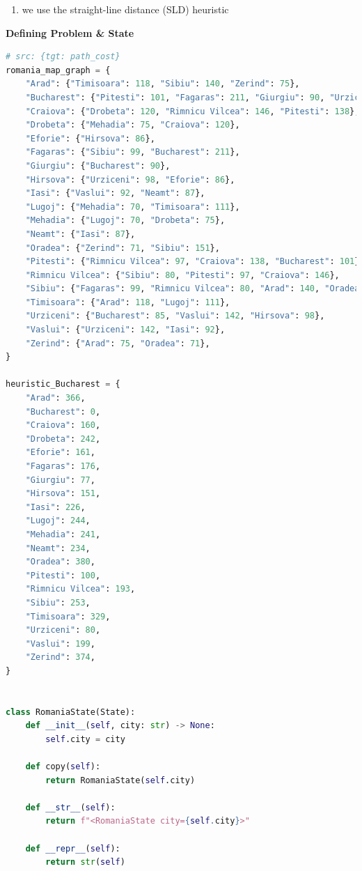 \begin{enumerate}
    \item we use the straight-line distance (SLD) heuristic
    \hfill \cite{ai/book/Artificial-Intelligence-A-Modern-Approach/Russell-Norvig}
\end{enumerate}


\vspace{0.5cm}

{\centering \textbf{Defining Problem \& State} \par}

\begin{lstlisting}[language=Python]
# src: {tgt: path_cost}
romania_map_graph = {
    "Arad": {"Timisoara": 118, "Sibiu": 140, "Zerind": 75},
    "Bucharest": {"Pitesti": 101, "Fagaras": 211, "Giurgiu": 90, "Urziceni": 85},
    "Craiova": {"Drobeta": 120, "Rimnicu Vilcea": 146, "Pitesti": 138},
    "Drobeta": {"Mehadia": 75, "Craiova": 120},
    "Eforie": {"Hirsova": 86},
    "Fagaras": {"Sibiu": 99, "Bucharest": 211},
    "Giurgiu": {"Bucharest": 90},
    "Hirsova": {"Urziceni": 98, "Eforie": 86},
    "Iasi": {"Vaslui": 92, "Neamt": 87},
    "Lugoj": {"Mehadia": 70, "Timisoara": 111},
    "Mehadia": {"Lugoj": 70, "Drobeta": 75},
    "Neamt": {"Iasi": 87},
    "Oradea": {"Zerind": 71, "Sibiu": 151},
    "Pitesti": {"Rimnicu Vilcea": 97, "Craiova": 138, "Bucharest": 101},
    "Rimnicu Vilcea": {"Sibiu": 80, "Pitesti": 97, "Craiova": 146},
    "Sibiu": {"Fagaras": 99, "Rimnicu Vilcea": 80, "Arad": 140, "Oradea": 151},
    "Timisoara": {"Arad": 118, "Lugoj": 111},
    "Urziceni": {"Bucharest": 85, "Vaslui": 142, "Hirsova": 98},
    "Vaslui": {"Urziceni": 142, "Iasi": 92},
    "Zerind": {"Arad": 75, "Oradea": 71},
}

heuristic_Bucharest = {
    "Arad": 366,
    "Bucharest": 0,
    "Craiova": 160,
    "Drobeta": 242,
    "Eforie": 161,
    "Fagaras": 176,
    "Giurgiu": 77,
    "Hirsova": 151,
    "Iasi": 226,
    "Lugoj": 244,
    "Mehadia": 241,
    "Neamt": 234,
    "Oradea": 380,
    "Pitesti": 100,
    "Rimnicu Vilcea": 193,
    "Sibiu": 253,
    "Timisoara": 329,
    "Urziceni": 80,
    "Vaslui": 199,
    "Zerind": 374,
}


class RomaniaState(State):
    def __init__(self, city: str) -> None:
        self.city = city

    def copy(self):
        return RomaniaState(self.city)
    
    def __str__(self):
        return f"<RomaniaState city={self.city}>"

    def __repr__(self):
        return str(self)
    

\end{lstlisting}

